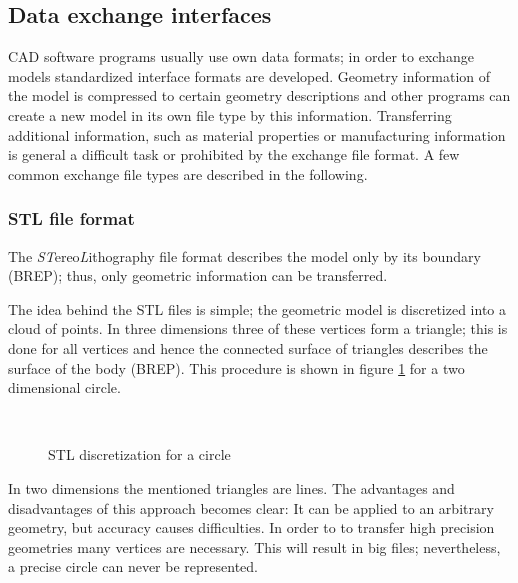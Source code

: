 \subsection{Data exchange interfaces}
CAD software programs usually use own data formats; in order to exchange models standardized interface formats are developed. Geometry information of the model is compressed to certain geometry descriptions and other programs can create a new model in its own file type by this information. Transferring additional information, such as material properties or manufacturing information is general a difficult task or prohibited by the exchange file format. A few common exchange file types are described in the following.
\subsubsection{STL file format}
The \emph{ST}ereo\emph{L}ithography file format describes the model only by its boundary (BREP); thus, only geometric information can be transferred. 

The idea behind the STL files is simple; the geometric model is discretized into a cloud of points. In three dimensions  three of these vertices form a triangle; this is done for all vertices and hence the connected surface of triangles describes the surface of the body (BREP). This procedure is shown in figure \ref{fig:STL} for a two dimensional circle.  
\begin{figure}
\centering
   \\
   \caption{STL discretization for a circle}
   \label{fig:STL}
\end{figure}
In two dimensions the mentioned triangles are lines. The advantages and disadvantages of this approach becomes clear: It can be applied to an arbitrary geometry, but accuracy causes difficulties. In order to to transfer high precision geometries many vertices are necessary. This will result in big files; nevertheless, a precise circle can never be represented. 

